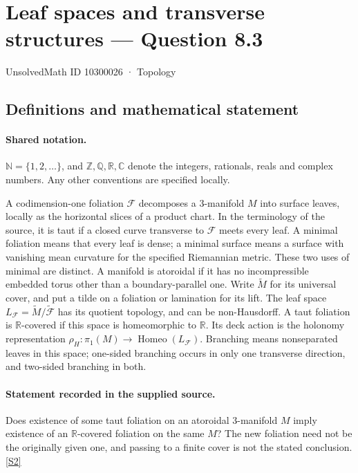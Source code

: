 \documentclass[11pt]{article}
\newcommand{\sref}[2]{\hyperlink{source:#1:#2}{[S#2]}}
\begin{document}
\setcounter{section}{10300025}
\section{Leaf spaces and transverse structures — Question 8.3}\label{10300026}
{\small\sffamily UnsolvedMath ID 10300026 · Topology}
\subsection{Definitions and mathematical statement}

\paragraph{Shared notation.}$\mathbb N=\{1,2,\ldots\}$, and $\mathbb Z,\mathbb Q,\mathbb R,\mathbb C$ denote the integers, rationals, reals and complex numbers. Any other conventions are specified locally.


A codimension-one foliation $\mathcal F$ decomposes a $3$-manifold $M$ into surface leaves, locally as the horizontal slices of a product chart. In the terminology of the source, it is taut if a closed curve transverse to $\mathcal F$ meets every leaf. A minimal foliation means that every leaf is dense; a minimal surface means a surface with vanishing mean curvature for the specified Riemannian metric. These two uses of minimal are distinct. A manifold is atoroidal if it has no incompressible embedded torus other than a boundary-parallel one. Write $\widetilde M$ for its universal cover, and put a tilde on a foliation or lamination for its lift. The leaf space $L_{\mathcal F}=\widetilde M/\widetilde{\mathcal F}$ has its quotient topology, and can be non-Hausdorff. A taut foliation is $\mathbb R$-covered if this space is homeomorphic to $\mathbb R$. Its deck action is the holonomy representation $\rho_H:\pi_1(M)\longrightarrow\operatorname{Homeo}(L_{\mathcal F})$. Branching means nonseparated leaves in this space; one-sided branching occurs in only one transverse direction, and two-sided branching in both.
\paragraph{Statement recorded in the supplied source.}
Does existence of some taut foliation on an atoroidal $3$-manifold $M$ imply existence of an $\mathbb R$-covered foliation on the same $M$? The new foliation need not be the originally given one, and passing to a finite cover is not the stated conclusion. \sref{10300026}{2}
\end{document}
